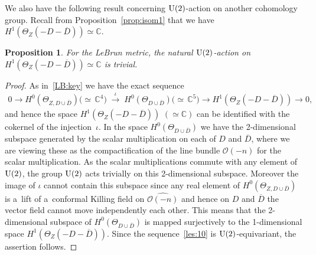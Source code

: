 \documentclass[pdftex]{sigma}
\numberwithin{equation}{section}
\newtheorem{Proposition}[Theorem]{Proposition}
{\theoremstyle{definition}
\newtheorem{Definition}[Theorem]{Definition}
\newtheorem{Remark}[Theorem]{Remark}
}
\begin{document}
We also have the following result concerning ${\rm{U}}(2)$-action on another cohomology group.
Recall from Proposition~\ref{prop:isom1} that we have $H^1(\Theta_Z(-D-\overline D))\simeq\mathbb{C}$.

\begin{Proposition}
For the LeBrun metric, the natural ${\rm{U}}(2)$-action on $H^1(\Theta_Z(-D-\overline D))\simeq\mathbb{C}$ is trivial.
\end{Proposition}

\begin{proof}
As in~\eqref{LB:key} we have the exact sequence
\begin{gather}
\label{les:10}
0
\longrightarrow
H^0(\Theta_{Z, D\cup\overline D})  \big({\simeq}\, \mathbb{C}^4\big)
\;\stackrel{\iota}{\longrightarrow}
\;
H^0(\Theta_{D\cup\overline D})
\big({\simeq}\, \mathbb{C}^5\big)
\longrightarrow
H^1( \Theta_Z(-D-\overline D))
\longrightarrow
0,
\end{gather}
and hence the space $H^1(\Theta_Z(-D-\overline D))$ $(\simeq\mathbb{C})$ can be identif\/ied with the cokernel of the
injection~$\iota$.
In the space $H^0(\Theta_{D\cup \overline D})$ we have the 2-dimensional subspace generated by the scalar multiplication
on each of $D$ and $\overline D$, where we are viewing these as the compactif\/ication of the line bundle $\mathscr
O(-n)$ for the scalar multiplication.
As the scalar multiplications commute with any element of ${\rm{U}}(2)$, the group ${\rm{U}}(2)$ acts trivially on this
2-dimensional subspace.
Moreover the image of $\iota$ cannot contain this subspace since any real element of $H^0(\Theta_{Z,D\cup\overline D})$
is a~lift of a~conformal Killing f\/ield on $\widehat{\mathscr O(-n)}$ and hence on $D$ and $\overline D$ the vector
f\/ield cannot move independently each other.
This means that the 2-dimensional subspace of $H^0(\Theta_{D\cup\overline D})$ is mapped surjectively to the
1-dimensional space $H^1(\Theta_Z(-D-\overline D))$.
Since the sequence~\eqref{les:10} is ${\rm{U}}(2)$-equivariant, the assertion follows.
\end{proof}
\end{document}
